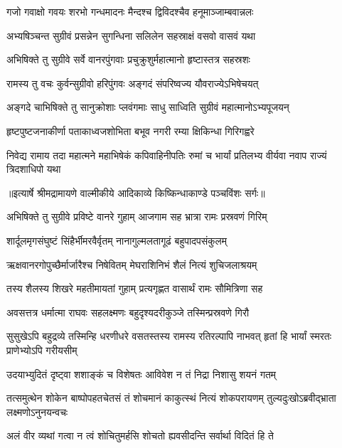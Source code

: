 \twolineshloka
{गजो गवाक्षो गवयः शरभो गन्धमादनः}
{मैन्दश्च द्विविदश्चैव हनूमाञ्जाम्बवान्नलः} %

\twolineshloka
{अभ्यषिञ्चन्त सुग्रीवं प्रसन्नेन सुगन्धिना}
{सलिलेन सहस्राक्षं वसवो वासवं यथा} %

\twolineshloka
{अभिषिक्ते तु सुग्रीवे सर्वे वानरपुंगवाः}
{प्रचुक्रुशुर्महात्मानो हृष्टास्तत्र सहस्रशः} %

\twolineshloka
{रामस्य तु वचः कुर्वन्सुग्रीवो हरिपुंगवः}
{अङ्गदं संपरिष्वज्य यौवराज्येऽभिषेचयत्} %

\twolineshloka
{अङ्गदे चाभिषिक्ते तु सानुक्रोशाः प्लवंगमाः}
{साधु साध्विति सुग्रीवं महात्मानोऽभ्यपूजयन्} %

\twolineshloka
{हृष्टपुष्टजनाकीर्णा पताकाध्वजशोभिता}
{बभूव नगरी रम्या क्षिकिन्धा गिरिगह्वरे} %

\fourlineindentedshloka
{निवेद्य रामाय तदा महात्मने}
{ महाभिषेकं कपिवाहिनीपतिः}
{रुमां च भार्यां प्रतिलभ्य वीर्यवा}
{नवाप राज्यं त्रिदशाधिपो यथा} %


{॥इत्यार्षे श्रीमद्रामायणे वाल्मीकीये आदिकाव्ये किष्किन्धाकाण्डे पञ्चविंशः सर्गः॥}


\twolineshloka
{अभिषिक्ते तु सुग्रीवे प्रविष्टे वानरे गुहाम्}
{आजगाम सह भ्रात्रा रामः प्रस्रवणं गिरिम्} %

\twolineshloka
{शार्दूलमृगसंघुष्टं सिंहैर्भीमरवैर्वृतम्}
{नानागुल्मलतागूढं बहुपादपसंकुलम्} %

\twolineshloka
{ऋक्षवानरगोपुच्छैर्मार्जारैश्च निषेवितम्}
{मेघराशिनिभं शैलं नित्यं शुचिजलाश्रयम्} %

\twolineshloka
{तस्य शैलस्य शिखरे महतीमायतां गुहाम्}
{प्रत्यगृह्णत वासार्थं रामः सौमित्रिणा सह} %

\twolineshloka
{अवसत्तत्र धर्मात्मा राघवः सहलक्ष्मणः}
{बहुदृश्यदरीकुञ्जे तस्मिन्प्रस्रवणे गिरौ} %

\threelineshloka
{सुसुखेऽपि बहुद्रव्ये तस्मिन्हि धरणीधरे}
{वसतस्तस्य रामस्य रतिरल्पापि नाभवत्}
{हृतां हि भार्यां स्मरतः प्राणेभ्योऽपि गरीयसीम्} %

\twolineshloka
{उदयाभ्युदितं दृष्ट्वा शशाङ्कं च विशेषतः}
{आविवेश न तं निद्रा निशासु शयनं गतम्} %

\threelineshloka
{तत्समुत्थेन शोकेन बाष्पोपहतचेतसं}
{तं शोचमानं काकुत्स्थं नित्यं शोकपरायणम्}
{तुल्यदुःखोऽब्रवीद्भ्राता लक्ष्मणोऽनुनयन्वचः} %

\twolineshloka
{अलं वीर व्यथां गत्वा न त्वं शोचितुमर्हसि}
{शोचतो ह्यवसीदन्ति सर्वार्था विदितं हि ते} %


